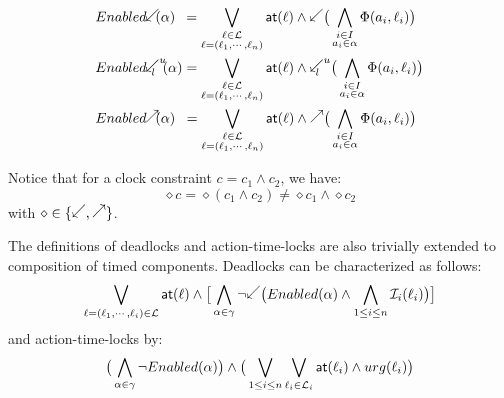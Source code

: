 \begin{align*}
  &\enabledbackward{\alpha}\hspace{1.8mm}=\bigvee_{\substack{\loc\in\Loc\\
  \loc=(\loc_1,\cdots,\loc_n)}}\al{\loc}\wedge \backward\big(\bigwedge_{\substack{
    i\in{I}\\a_i\in\alpha}}\Phi(a_i,\loc_i)\big) \\
  &\enabledbackwardb{\alpha}{l}{u}=\bigvee_{\substack{\loc\in\Loc\\
  \loc=(\loc_1,\cdots,\loc_n)}}\al{\loc}\wedge \backwardp{l}{u}\big(\bigwedge_{
    \substack{i\in{I}\\a_i\in\alpha}}\Phi(a_i,\loc_i)\big) \\
  &\enabledforward{\alpha}\hspace{1.9mm}=\bigvee_{\substack{\loc\in\Loc\\
  \loc=(\loc_1,\cdots,\loc_n)}}\al{\loc}\wedge \forward\big(\bigwedge_{\substack{
    i\in{I}\\a_i\in\alpha}}\Phi(a_i,\loc_i)\big) \\
\end{align*}

Notice that for a clock constraint $c=c_1\wedge c_2$, we have:
\begin{displaymath}
  \diamond c = \diamond (c_1\wedge c_2) \neq \diamond c_1\wedge \diamond c_2
\end{displaymath}
with $\diamond\in\{\backward,\forward\}$.

The definitions of deadlocks and action-time-locks are also trivially extended
to composition of timed components. Deadlocks can be characterized as follows:
\begin{displaymath}
  \bigvee_{\loc=(\loc_1,\cdots,\loc_i)\in\Loc}\al{\loc}\wedge
  \big[\bigwedge_{\alpha\in\gamma}\neg\backward\big(\enabled{\alpha}\wedge
  \bigwedge_{1\le i\le n}\Invb{i}{\loc_i}\big)\big]
\end{displaymath}
and action-time-locks by:
\begin{displaymath}
  \big(\bigwedge_{\alpha\in\gamma}\neg Enabled(\alpha)\big)\wedge\big(
  \bigvee_{1\le i\le n}\bigvee_{\ell_i\in\mathcal{L}_i}\textsf{at}(\ell_i)\wedge urg(\ell_i)\big)
\end{displaymath}

